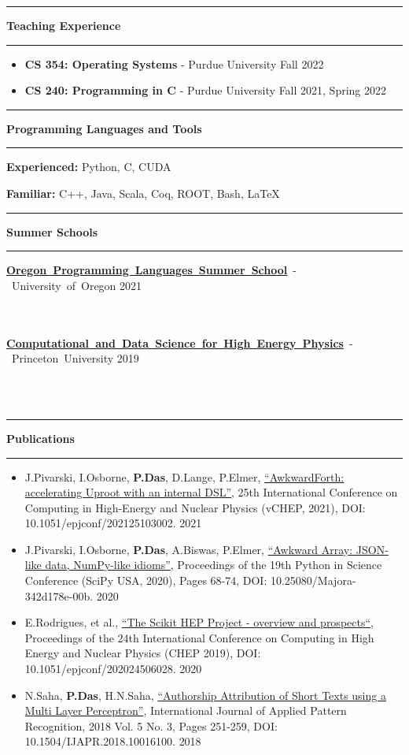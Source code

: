 \documentclass[10pt, letterpaper]{article}
\newcommand{\EducationEntry}[4]{
    \noindent\mbox{#1} \hfill
    \mbox{#2} \\
    \indent
    \mbox{\textit{#3}} \vspace{5pt}\\
    \parbox[t][\height][c]{\textwidth}{\small{#4}}
	\vspace{-14pt}
}
\newcommand{\Section}[1]{
    \Line \par
    \vspace{1pt}
    \textbf{\fontsize{13}{13}\selectfont #1} \par
    \vspace{-7pt}
    \Line \par
    \vspace{3pt}
}
\newcommand{\Line}{
\noindent\rule{\textwidth}{0.4pt}}
\newenvironment{tightitemize}
{
    \vspace{-\topsep}
    \begin{itemize}
        \itemsep2pt \parskip0pt \parsep0pt
}
{
    \end{itemize}
    \vspace{-\topsep}
}
\begin{document}
\Section{Teaching Experience}
\begin{tightitemize}
\item \textbf{CS 354: Operating Systems} - Purdue University \hfill{Fall 2022}
\item \textbf{CS 240: Programming in C} - Purdue University \hfill{Fall 2021, Spring 2022}
\end{tightitemize}

\vspace{-48pt}
%
%
\Section{Programming Languages and Tools}
\vspace{-4pt}
\textbf{Experienced:} Python, C, CUDA

\textbf{Familiar:} C++, Java, Scala, Coq, ROOT, Bash, \LaTeX
\vspace{-6pt}

%
%
\Section{Summer Schools}
\vspace{-4pt}
\EducationEntry{\textbf{{\href{https://www.cs.uoregon.edu/research/summerschool/summer21/index.php}{Oregon Programming Languages Summer School}}} - University of Oregon}{2021}{}{}\vspace{-15pt}\\
\EducationEntry{\textbf{{\href{https://codas-hep.org/}{Computational and Data Science for High Energy Physics}}} - Princeton University}{2019}{}{}\\

\vspace{-34pt}

%
%
\Section{Publications}
\small{\begin{tightitemize}
    \item J.Pivarski, I.Osborne, {\textbf{P.Das}}, D.Lange, P.Elmer, {\href{https://www.epj-conferences.org/articles/epjconf/abs/2021/05/epjconf_chep2021_03002/epjconf_chep2021_03002.html}{``AwkwardForth: accelerating Uproot with an internal DSL''}}, 25th International Conference on Computing in High-Energy and Nuclear Physics (vCHEP, 2021), DOI: 10.1051/epjconf/202125103002. \hfill{2021}
    \item J.Pivarski, I.Osborne, {\textbf{P.Das}}, A.Biswas, P.Elmer, {\href{http://conference.scipy.org/proceedings/scipy2020/jim_pivarski.html}{``Awkward Array: JSON-like data, NumPy-like idioms''}}, Proceedings of the 19th Python in Science Conference (SciPy USA, 2020), Pages 68-74, DOI: 10.25080/Majora-342d178e-00b. \hfill{2020}
    \item E.Rodrigues, et al., {\href{https://www.epj-conferences.org/articles/epjconf/abs/2020/21/epjconf_chep2020_06028/epjconf_chep2020_06028.html}{``The Scikit HEP Project - overview and prospects``}}, Proceedings of the 24th International Conference on Computing in High Energy and Nuclear Physics (CHEP 2019), DOI: 10.1051/epjconf/202024506028.  \hfill{2020}
    \item N.Saha, {\textbf{P.Das}}, H.N.Saha, {\href{https://www.inderscienceonline.com/doi/abs/10.1504/IJAPR.2018.094819}{``Authorship Attribution of Short Texts using a Multi Layer Perceptron''}}, International Journal of Applied Pattern Recognition, 2018 Vol. 5 No. 3, Pages 251-259, DOI: 10.1504/IJAPR.2018.10016100. \hfill{2018}
\end{tightitemize}}
\end{document}
